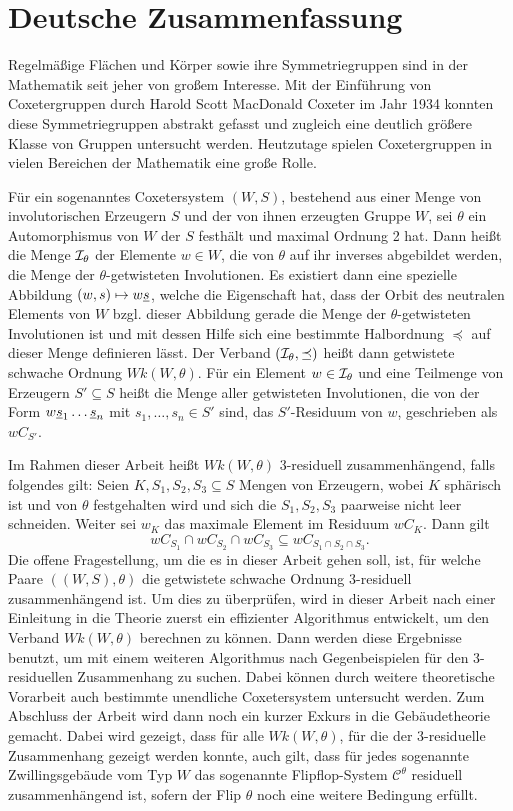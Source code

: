 \chapter*{Deutsche Zusammenfassung}

Regelmäßige Flächen und Körper sowie ihre Symmetriegruppen sind in der Mathe\-matik seit jeher von großem Interesse. Mit der Einführung von Coxetergruppen durch Harold Scott MacDonald Coxeter im Jahr 1934 konnten diese Symmetriegruppen abstrakt gefasst und zugleich eine deutlich größere Klasse von Gruppen untersucht werden. Heutzutage spielen Coxetergruppen in vielen Bereichen der Mathematik eine große Rolle.

Für ein sogenanntes Coxetersystem $(W,S)$, bestehend aus einer Menge von involutorischen Erzeugern $S$ und der von ihnen erzeugten Gruppe $W$, sei $\theta$ ein Automorphismus von $W$ der $S$ festhält und maximal Ordnung 2 hat. Dann heißt die Menge $\mathcal{I}_{\theta}$ der Elemente $w \in W$, die von $\theta$ auf ihr inverses abgebildet werden, die Menge der $\theta$-getwisteten Involutionen. Es existiert dann eine spezielle Abbildung $(w,s) \mapsto w \underline{s}$, welche die Eigenschaft hat, dass der Orbit des neutralen Elements von $W$ bzgl. dieser Abbildung gerade die Menge der $\theta$-getwisteten Involutionen ist und mit dessen Hilfe sich eine bestimmte Halbordnung $\preceq$ auf dieser Menge definieren lässt. Der Verband $(\mathcal{I}_{\theta},\preceq)$ heißt dann getwistete schwache Ordnung $Wk(W,\theta)$. Für ein Element $w \in \mathcal{I}_{\theta}$ und eine Teilmenge von Erzeugern $S' \subseteq S$ heißt die Menge aller getwisteten Involutionen, die von der Form $w \underline{s}_1 \ldots \underline{s}_n$ mit $s_1,\ldots,s_n \in S'$ sind, das $S'$-Residuum von $w$, geschrieben als $w C_{S'}$.

Im Rahmen dieser Arbeit heißt $Wk(W,\theta)$ 3-residuell zusammenhängend, falls folgendes gilt: Seien $K,S_1,S_2,S_3 \subseteq S$ Mengen von Erzeugern, wobei $K$ sphärisch ist und von $\theta$ festgehalten wird und sich die $S_1,S_2,S_3$ paarweise nicht leer schneiden. Weiter sei $w_K$ das maximale Element im Residuum $w C_K$. Dann gilt
$$ w C_{S_1} \cap w C_{S_2} \cap w C_{S_3} \subseteq w C_{S_1 \cap S_2 \cap S_3}. $$
Die offene Fragestellung, um die es in dieser Arbeit gehen soll, ist, für welche Paare $((W,S),\theta)$ die getwistete schwache Ordnung 3-residuell zusammenhängend ist. Um dies zu überprüfen, wird in dieser Arbeit nach einer Einleitung in die Theorie zuerst ein effizienter Algorithmus entwickelt, um den Verband $Wk(W,\theta)$ berechnen zu können. Dann werden diese Ergebnisse benutzt, um mit einem weiteren Algorithmus nach Gegenbeispielen für den 3-residuellen Zusammenhang zu suchen. Dabei können durch weitere theoretische Vorarbeit auch bestimmte unendliche Coxetersystem untersucht werden. Zum Abschluss der Arbeit wird dann noch ein kurzer Exkurs in die Gebäudetheorie gemacht. Dabei wird gezeigt, dass für alle $Wk(W,\theta)$, für die der 3-residuelle Zusammenhang gezeigt werden konnte, auch gilt, dass für jedes sogenannte Zwillingsgebäude vom Typ $W$ das sogenannte Flipflop-System $\mathcal{C}^\theta$ residuell zusammenhängend ist, sofern der Flip $\theta$ noch eine weitere Bedingung erfüllt.